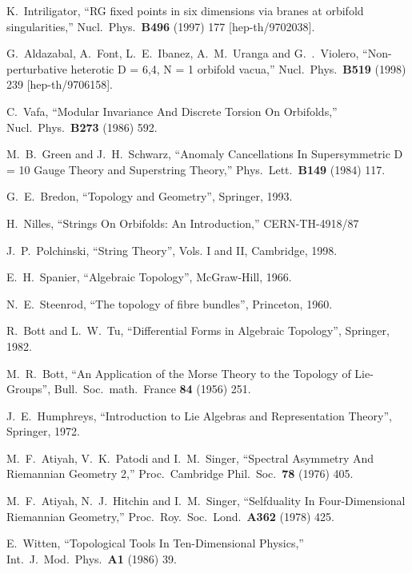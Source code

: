\documentclass[a4paper,12pt,twoside]{article}
\numberwithin{equation}{section}
\begin{document}
\begin{thebibliography}{xx}
 K.~Intriligator, ``RG fixed points in six
  dimensions via branes at orbifold singularities,'' Nucl.\ Phys.\ 
  {\bf B496} (1997) 177 [hep-th/9702038].
  
 G.~Aldazabal, A.~Font, L.~E.~Ibanez, A.~M.~Uranga
  and G.~.~Violero, ``Non-perturbative heterotic D = 6,4, N = 1
  orbifold vacua,'' Nucl.\ Phys.\ {\bf B519} (1998) 239
  [hep-th/9706158].

 C.~Vafa, ``Modular Invariance And Discrete
  Torsion On Orbifolds,'' Nucl.\ Phys.\ {\bf B273} (1986) 592.

 M.~B.~Green and J.~H.~Schwarz, ``Anomaly
  Cancellations In Supersymmetric D = 10 Gauge Theory and Superstring
  Theory,'' Phys.\ Lett.\ {\bf B149} (1984) 117.

 G.~E.~Bredon, ``Topology and Geometry'', Springer, 1993.

 H.~Nilles, ``Strings On Orbifolds: An
  Introduction,'' CERN-TH-4918/87

 J.~P.~Polchinski, ``String Theory'', Vols. I and II,
  Cambridge, 1998.
  
 E.~H.~Spanier, ``Algebraic Topology'', McGraw-Hill, 1966.

 N.~E.~Steenrod, ``The topology of fibre bundles'',
  Princeton, 1960.

 R.~Bott and L.~W.~Tu, ``Differential Forms in
  Algebraic Topology'', Springer, 1982.
  
 M.~R.~Bott, ``An Application of the Morse Theory to the
  Topology of Lie-Groups'', Bull.\ Soc.\ math.\ France {\bf 84} (1956)
  251.

 J.~E.~Humphreys, ``Introduction to Lie Algebras
  and Representation Theory'', Springer, 1972.
  
 M.~F.~Atiyah, V.~K.~Patodi and I.~M.~Singer,
  ``Spectral Asymmetry And Riemannian Geometry 2,'' Proc.\ Cambridge
  Phil.\ Soc.\ {\bf 78} (1976) 405.
  
 M.~F.~Atiyah, N.~J.~Hitchin and I.~M.~Singer,
  ``Selfduality In Four-Dimensional Riemannian Geometry,'' Proc.\ 
  Roy.\ Soc.\ Lond.\ {\bf A362} (1978) 425.
  
 E.~Witten, ``Topological Tools In
  Ten-Dimensional Physics,'' Int.\ J.\ Mod.\ Phys.\ {\bf A1} (1986)
  39.

\end{thebibliography}
\end{document}
